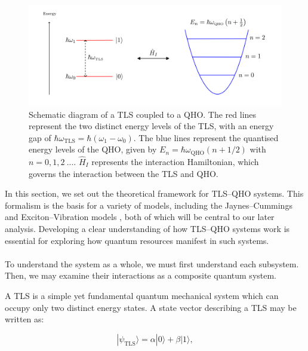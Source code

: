 \documentclass[11pt]{article}
\begin{document}
\begin{figure}[h]
    \centering
    \includegraphics[]{Images/TLSQHO.png}
    \caption{Schematic diagram of a TLS coupled to a QHO. The red lines represent the two distinct energy levels of the TLS, with an energy gap of $\hbar\omega_{\scriptscriptstyle \text{TLS}} = \hbar\left(\omega_1 - \omega_0\right)$. The blue lines represent the quantised energy levels of the QHO, given by $E_n = \hbar\omega_{\scriptscriptstyle \text{QHO}}\left(n+1/2\right)$ with $n=0,1,2\ ...$. $\hat{H}_I$ represents the interaction Hamiltonian, which governs the interaction between the TLS and QHO.}
    \label{img:TLSQHO}
\end{figure}

\noindent In this section, we set out the theoretical framework for TLS--QHO systems. This formalism is the basis for a variety of models, including the Jaynes--Cummings and Exciton--Vibration models \cite{Hamiltonian2012-JC_Friction, ExVib2015-ChemPhysBorn}, both of which will be central to our later analysis. Developing a clear understanding of how TLS--QHO systems work is essential for exploring how quantum resources manifest in such systems. \\
\\
To understand the system as a whole, we must first understand each subsystem. Then, we may examine their interactions as a composite quantum system.

A TLS is a simple yet fundamental quantum mechanical system which can occupy only two distinct energy states. A state vector describing a TLS may be written as:

\begin{equation}
    |\psi_{\scriptscriptstyle \text{TLS}}\rangle = \alpha|0\rangle + \beta|1\rangle,
\end{equation}
\end{document}
